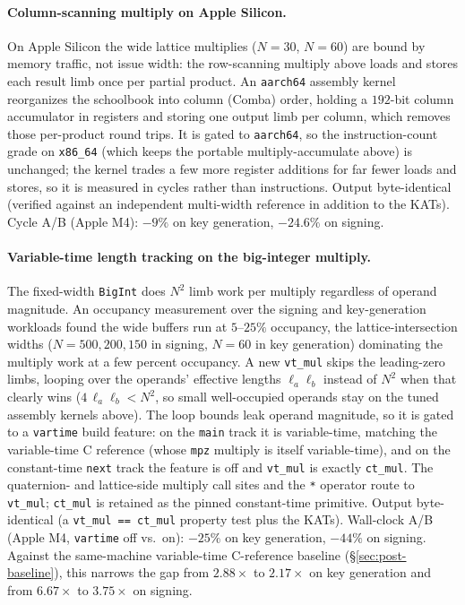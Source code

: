 \paragraph{Column-scanning multiply on Apple Silicon.}
On Apple Silicon the wide lattice multiplies ($N = 30$, $N = 60$) are
bound by memory traffic, not issue width: the row-scanning multiply
above loads and stores each result limb once per partial product.  An
\texttt{aarch64} assembly kernel reorganizes the schoolbook into
column (Comba) order, holding a $192$-bit column accumulator in
registers and storing one output limb per column, which removes those
per-product round trips.  It is gated to \texttt{aarch64}, so the
instruction-count grade on \texttt{x86\_64} (which keeps the portable
multiply-accumulate above) is unchanged; the kernel trades a few more
register additions for far fewer loads and stores, so it is measured in
cycles rather than instructions.  Output byte-identical (verified
against an independent multi-width reference in addition to the KATs).
Cycle A/B (Apple M4): $-9\%$ on key generation, $-24.6\%$ on signing.

\paragraph{Variable-time length tracking on the big-integer multiply.}
The fixed-width \texttt{BigInt} does $N^2$ limb work per multiply
regardless of operand magnitude.  An occupancy measurement over the
signing and key-generation workloads found the wide buffers run at
$5$--$25\%$ occupancy, the lattice-intersection widths ($N = 500, 200,
150$ in signing, $N = 60$ in key generation) dominating the multiply
work at a few percent occupancy.  A new \texttt{vt\_mul} skips the
leading-zero limbs, looping over the operands' effective lengths
$\ell_a \ell_b$ instead of $N^2$ when that clearly wins
($4\,\ell_a \ell_b < N^2$, so small well-occupied operands stay on the
tuned assembly kernels above).  The loop bounds leak operand magnitude,
so it is gated to a \texttt{vartime} build feature: on the \texttt{main}
track it is variable-time, matching the variable-time C reference (whose
\texttt{mpz} multiply is itself variable-time), and on the
constant-time \texttt{next} track the feature is off and \texttt{vt\_mul}
is exactly \texttt{ct\_mul}.  The quaternion- and lattice-side multiply
call sites and the \texttt{*} operator route to \texttt{vt\_mul};
\texttt{ct\_mul} is retained as the pinned constant-time primitive.
Output byte-identical (a \texttt{vt\_mul == ct\_mul} property test plus
the KATs).  Wall-clock A/B (Apple M4, \texttt{vartime} off vs.\ on):
$-25\%$ on key generation, $-44\%$ on signing.  Against the same-machine
variable-time C-reference baseline (\S\ref{sec:post-baseline}), this
narrows the gap from $2.88\times$ to $2.17\times$ on key generation and
from $6.67\times$ to $3.75\times$ on signing.

